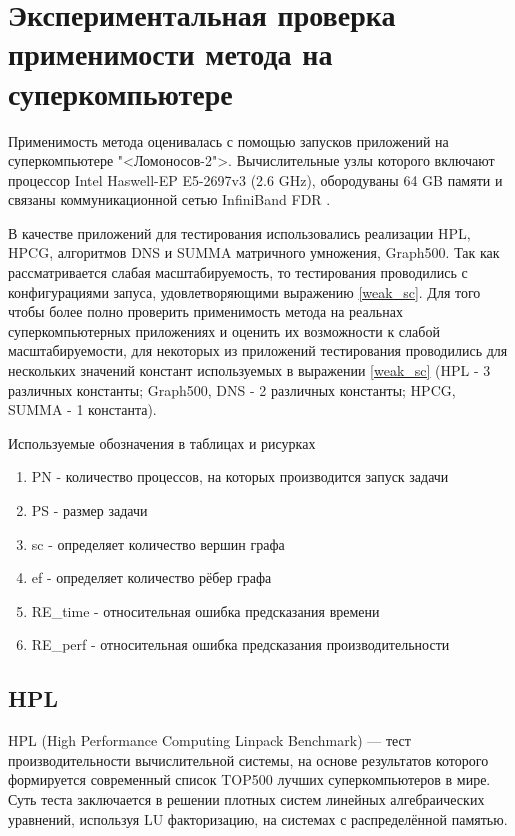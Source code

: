 \chapter{Экспериментальная проверка применимости метода на суперкомпьютере}
	Применимость метода оценивалась с помощью запусков приложений на суперкомпьютере "<Ломоносов-2">. Вычислительные узлы которого включают процессор Intel Haswell-EP E5-2697v3 (2.6 GHz), обородуваны 64 GB памяти и связаны коммуникационной сетью InfiniBand FDR \cite{Lom2_stat}.

	В качестве приложений для тестирования использовались реализации HPL, HPCG, алгоритмов DNS и SUMMA матричного умножения, Graph500. Так как рассматривается слабая масштабируемость, то тестирования проводились с конфигурациями запуса, удовлетворяющими выражению \ref{weak_sc}. Для того чтобы более полно проверить применимость метода на реальнах суперкомпьютерных приложениях и оценить их возможности к слабой масштабируемости, для некоторых из приложений тестирования проводились для нескольких значений констант используемых в выражении \ref{weak_sc} (HPL - 3 различных константы; Graph500, DNS - 2 различных константы; HPCG, SUMMA - 1 константа).

	Используемые обозначения в таблицах и рисурках
	\begin{enumerate}[\(\cdot\)]
		\item PN - количество процессов, на которых производится запуск задачи
		\item PS - размер задачи
		\item sc - определяет количество вершин графа
		\item ef - определяет количество рёбер графа
		\item RE\_time - относительная ошибка предсказания времени
		\item RE\_perf - относительная ошибка предсказания производительности
	\end{enumerate}

	\section{HPL}

	HPL (High Performance Computing Linpack Benchmark) — тест производительности вычислительной системы, на основе результатов которого формируется современный список TOP500 \cite{top500} лучших суперкомпьютеров в мире. Суть теста заключается в решении плотных систем линейных алгебраических уравнений, используя LU факторизацию, на системах с распределённой памятью.

